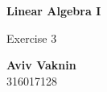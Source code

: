 \documentclass[a4paper, 12pt]{article}
\begin{document}
    \begin{center}
        \vspace*{4.4cm}
            
        \Huge
        \textbf{Linear Algebra I}
            
        \vspace{0.5cm}
        \LARGE
        Exercise 3

        \vfill
            
        \Large
        \textbf{Aviv Vaknin}\\316017128
                    
    \end{center}
\end{document}
